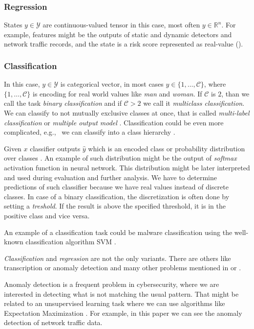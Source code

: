 \subsubsection*{Regression}
States $y \in \mathcal{Y}$ are continuous-valued tensor in this case, most often $y \in \mathbb{R}^{n}$. For example, features might be the outputs of static and dynamic detectors and network traffic records, and the state is a risk score represented as real-value (\cite{Jaganathan2015}).

\subsubsection*{Classification}
In this case, $y \in \mathcal{Y}$ is categorical vector, in most cases $y \in \{1,\dots,\mathcal{C}\}$, where $\{1,\dots,\mathcal{C}\}$ is encoding for real world values like \emph{man} and \emph{woman}. If $\mathcal{C}$ is $2$, than we call the task \emph{binary classification} and if $\mathcal{C}>2$ we call it \emph{multiclass classification}. We can classify to not mutually exclusive classes at once, that is called \emph{multi-label classification} or \emph{multiple output model} \cite{murphy2013machine}. Classification could be even more complicated, e.g., \ we can classify into a class hierarchy \cite{zhang2020dive}.

Given $x$ classifier outputs $\hat{y}$ which is an encoded class or probability distribution over classes \cite{GoodBengCour16}. An example of such distribution might be the output of \emph{softmax} activation function in neural network. This distribution might be later interpreted and used during evaluation and further analysis. We have to determine predictions of such classifier because we have real values instead of discrete classes. In case of a binary classification, the discretization is often done by setting a \emph{treshold}. If the result is above the specified threshold, it is in the positive class and vice versa.

An example of a classification task could be malware classification using the well-known classification algorithm SVM \cite{Kruczkowski2014}.

\emph{Classification} and \emph{regression} are not the only variants. There are others like transcription \cite{GoodBengCour16} or anomaly detection \cite{Chandola2009} and many other problems mentioned in \cite{GoodBengCour16} or \cite{zhang2020dive}. 

Anomaly detection is a frequent problem in cybersecurity, where we are interested in detecting what is not matching the usual pattern. That might be related to an unsupervised learning task where we can use algorithms like Expectation Maximization \cite{Dempster1977}. For example, in this paper \cite{IglesiasVazquez2014} we can see the anomaly detection of network traffic data.

